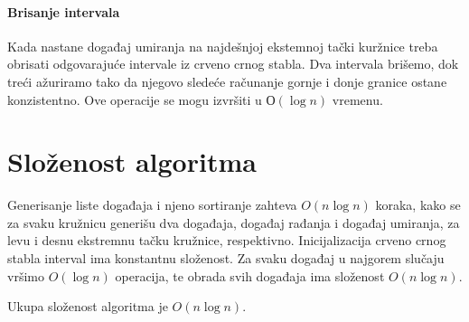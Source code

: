 \documentclass[a4paper,12pt]{article}
\begin{document}
\paragraph{Brisanje intervala}
\label{par:intd}

Kada nastane događaj umiranja na najdešnjoj ekstemnoj tački kuržnice treba obrisati odgovarajuće intervale iz crveno crnog stabla. Dva intervala brišemo, dok treći ažuriramo tako da njegovo sledeće računanje gornje i donje granice ostane konzistentno.
Ove operacije se mogu izvršiti u $О(\log n)$ vremenu.

\section{Složenost algoritma}
\label{sec:complexity}

Generisanje liste događaja i njeno sortiranje zahteva $O(n \log n)$ koraka, kako se za svaku kružnicu generišu dva događaja, događaj rađanja i događaj umiranja, za levu i desnu ekstremnu tačku kružnice, respektivno. Inicijalizacija crveno crnog stabla interval ima konstantnu složenost. Za svaku događaj u najgorem slučaju vršimo $O(\log n)$ operacija, te obrada svih događaja ima složenost $O(n \log n)$.

Ukupa složenost algoritma je $O(n \log n)$.

\printbibliography[title={Literatura}]
\end{document}
